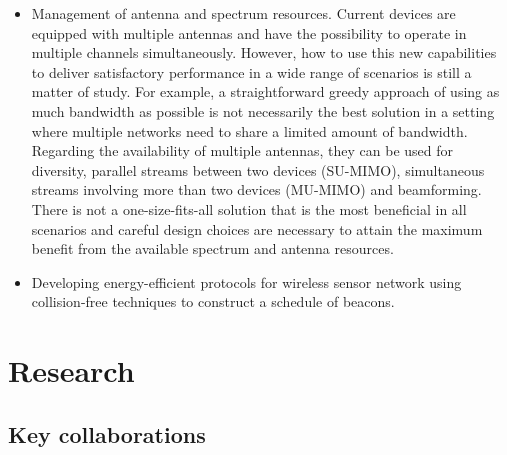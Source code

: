 \documentclass[a4paper,twocolumns]{article}%
\begin{document}
\begin{itemize}
\item Management of antenna and spectrum resources.
Current devices are equipped with multiple antennas and have the possibility to operate in multiple channels simultaneously.
However, how to use this new capabilities to deliver satisfactory performance in a wide range of scenarios is still a matter of study.
For example, a straightforward greedy approach of using as much bandwidth as possible is not necessarily the best solution in a setting where multiple networks need to share a limited amount of bandwidth.
Regarding the availability of multiple antennas, they can be used for diversity, parallel streams between two devices (SU-MIMO), simultaneous streams involving more than two devices (MU-MIMO) and beamforming.
There is not a one-size-fits-all solution that is the most beneficial in all scenarios and careful design choices are necessary to attain the maximum benefit from the available spectrum and antenna resources.
\item Developing energy-efficient protocols for wireless sensor network using collision-free techniques to construct a schedule of beacons.
\end{itemize}

\section{Research}

\subsection{Key collaborations}
\end{document}
